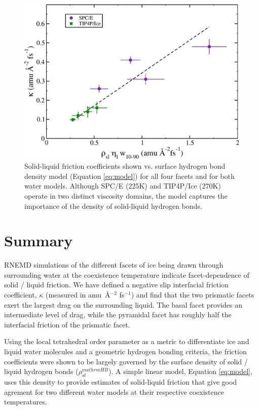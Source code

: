 \begin{figure}
\includegraphics[width=\linewidth]{Figures/simpleModel}
\caption{\label{fig:simpleModel} Solid-liquid friction coefficients
  shown vs. surface hydrogen bond density model (Equation \eqref{eq:model})
  for all four facets and for both water models.  Although SPC/E
  (225K) and TIP4P/Ice (270K) operate in two distinct viscosity
  domains, the model captures the importance of the density of
  solid-liquid hydrogen bonds.}
\end{figure}                                            

\section{Summary}
RNEMD simulations of the different facets of ice being drawn through
surrounding water at the coexistence temperature indicate
facet-dependence of solid / liquid friction.  We have defined a
negative slip interfacial friction coefficient, $\kappa$ (measured in
amu~\AA$^{-2}$ fs$^{-1}$) and find that the two prismatic facets exert
the largest drag on the surrounding liquid.  The basal facet provides
an intermediate level of drag, while the pyramidal facet has roughly
half the interfacial friction of the prismatic facet.

Using the local tetrahedral order parameter as a metric to
differentiate ice and liquid water molecules and a geometric hydrogen
bonding criteria, the friction coefficients were shown to be largely
governed by the surface density of solid / liquid hydrogen bonds
($\rho_{sl}^{mathrm{HB}}$).  A simple linear model, Equation
\eqref{eq:model}, uses this density to provide estimates of
solid-liquid friction that give good agrement for two different water
models at their respective coexistence temperatures.

